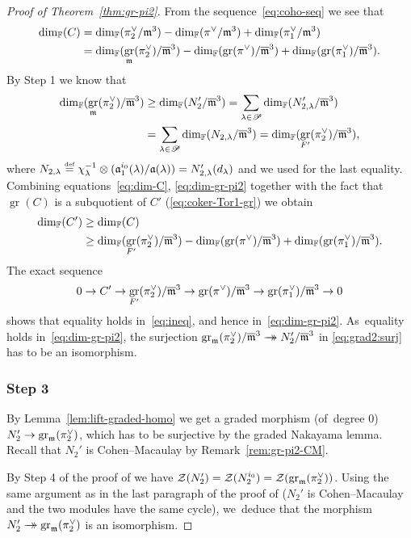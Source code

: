 \documentclass[JEP,XML,SOM,Unicode,NoFloatCountersInSection, NoEqCountersInSection,published]{cedram}
\newcommand{\onto}{\mathchoice{\to\hspace*{-5mm}\to}{\mathrel{\hbox{$\to\hspace*{-2.85mm}\to$}}}{\to\hspace*{-3mm}\to}{\to\hspace*{-3mm}\to}}
\let\ovl\overline
\newcommand{\defeq}{\stackrel{\textrm{\tiny{\upshape{def}}}}{=}}
\newcommand{\F}{\mathbb{F}}
\renewcommand{\P}{\mathscr P}
\DeclareMathOperator{\gr}{gr}
\theoremstyle{plain}
\theoremstyle{definition}
\begin{document}
\begin{proof}[Proof of Theorem~\ref{thm:gr-pi2}]
From the sequence~\eqref{eq:coho-seq} we see that
\begin{equation}\label{eq:dim-C}
\begin{aligned}
\dim_\F(C) &= \dim_\F(\pi_2^\vee/\m^3)-\dim_\F(\pi^\vee/\m^3)+\dim_\F(\pi_1^\vee/\m^3) \\
& = \dim_\F(\gr_{\m}(\pi_2^\vee)/\ovl\m^3)-\dim_\F(\gr(\pi^\vee)/\ovl\m^3)+\dim_\F(\gr(\pi_1^\vee)/\ovl\m^3).
\end{aligned}
\end{equation}
By Step 1 we know that
\begin{equation}\label{eq:dim-gr-pi2}
\begin{aligned}
\dim_\F(\gr_{\m}(\pi_2^\vee)/\ovl\m^3) &\ge \dim_\F(N_2'/\ovl\m^3) = \sum_{\lambda \in \P} \dim_\F(N_{2,\lambda}'/\ovl\m^3)\\
&= \sum_{\lambda \in \P} \dim_\F(N_{2,\lambda}/\ovl\m^3) = \dim_\F(\gr_{F'}(\pi_2^\vee)/\ovl\m^3),
\end{aligned}
\end{equation}
where $N_{2,\lambda} \defeq \chi_\lambda^{-1} \otimes (\mathfrak{a}_1^{i_0}(\lambda)/\mathfrak{a}(\lambda)) = N_{2,\lambda}'(d_\lambda)$ and we used \cite[Cor.\,4.4.5]{BHHMS4} for the last equality.
Combining equations~\eqref{eq:dim-C}, \eqref{eq:dim-gr-pi2} together with the fact that $\gr(C)$ is a subquotient of $C'$ (\cf \eqref{eq:coker-Tor1-gr}) we obtain
\begin{equation}
\begin{aligned}\label{eq:ineq}
\dim_\F(C') &\ge \dim_\F(C)\\
&\ge \dim_\F(\gr_{F'}(\pi_2^\vee)/\ovl\m^3)
-\dim_\F(\gr(\pi^\vee)/\ovl\m^3)+\dim_\F(\gr(\pi_1^\vee)/\ovl\m^3).
\end{aligned}
\end{equation}
The exact sequence
\begin{equation*}
0 \to C' \to \gr_{F'}(\pi_2^\vee)/\ovl\m^3 \to \gr(\pi^\vee)/\ovl\m^3 \to \gr(\pi_1^\vee)/\ovl\m^3 \to 0
\end{equation*}
shows that equality holds in~\eqref{eq:ineq}, and hence in~\eqref{eq:dim-gr-pi2}. As~equality holds in~\eqref{eq:dim-gr-pi2}, the surjection $\gr_\m(\pi_2^\vee)/ \ovl\m^3 \onto N_2'/\ovl\m^3$ in \eqref{eq:grad2:surj} has to be an isomorphism.

\subsubsection*{Step 3} By Lemma~\ref{lem:lift-graded-homo} we get a graded morphism (of~degree $0$) $N_2' \to \gr_\m(\pi_2^\vee)$, which has to be surjective by the graded Nakayama lemma.
Recall that $N_2'$ is Cohen--Macaulay by Remark~\ref{rem:gr-pi2-CM}.

By Step 4 of the proof of \cite[Prop.\,4.4.3]{BHHMS4} we have $\mathcal{Z}(N_2') = \mathcal{Z}(N_2^{i_0}) = \mathcal{Z}(\gr_\m(\pi_2^\vee))$.
Using the same argument as in the last paragraph of the proof of \cite[Prop.\,4.4.3]{BHHMS4} (\ie $N_2'$ is Cohen--Macaulay and the two modules have the same cycle), we~deduce that the morphism $N_2' \onto \gr_\m(\pi_2^\vee)$ is an isomorphism.
\end{proof}
\end{document}
